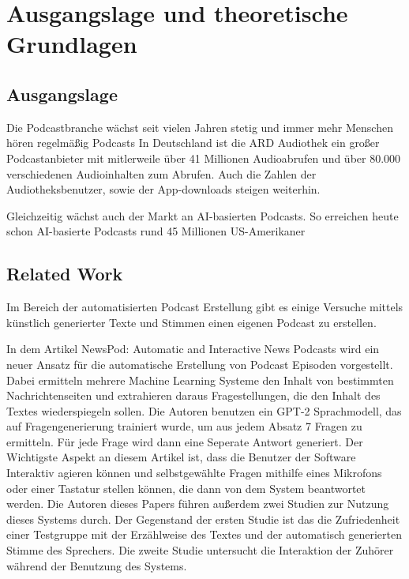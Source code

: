 \chapter{Ausgangslage und theoretische Grundlagen}\label{ch:data}

\section{Ausgangslage}
 
Die Podcastbranche wächst seit vielen Jahren stetig und immer mehr Menschen hören regelmäßig Podcasts 
In Deutschland ist die ARD Audiothek ein großer Podcastanbieter mit mitlerweile über 41 Millionen Audioabrufen und über 80.000 verschiedenen Audioinhalten zum Abrufen. Auch die Zahlen der Audiotheksbenutzer, sowie der App-downloads steigen weiterhin. \cite{gotting2023}

Gleichzeitig wächst auch der Markt an AI-basierten Podcasts. So erreichen heute schon AI-basierte Podcasts rund 45 Millionen US-Amerikaner 

\section{Related Work}

Im Bereich der automatisierten Podcast Erstellung gibt es einige Versuche mittels künstlich generierter Texte und Stimmen einen eigenen Podcast zu erstellen.

In dem Artikel \glqq NewsPod: Automatic and Interactive News Podcasts\grqq{} \cite{laban2022} wird ein neuer Ansatz für die automatische Erstellung von Podcast Episoden vorgestellt. 
Dabei ermitteln mehrere Machine Learning Systeme den Inhalt von bestimmten Nachrichtenseiten und extrahieren daraus Fragestellungen, die den Inhalt des Textes wiederspiegeln sollen. Die Autoren benutzen ein GPT-2 Sprachmodell, das auf Fragengenerierung trainiert wurde, um aus jedem Absatz 7 Fragen zu ermitteln. 
Für jede Frage wird dann eine Seperate Antwort generiert. 
Der Wichtigste Aspekt an diesem Artikel ist, dass die Benutzer der Software Interaktiv agieren können und selbstgewählte Fragen mithilfe eines Mikrofons oder einer Tastatur stellen können, die dann von dem System beantwortet werden. 
Die Autoren dieses Papers führen außerdem zwei Studien zur Nutzung dieses Systems durch.
Der Gegenstand der ersten Studie ist das die Zufriedenheit einer Testgruppe mit der Erzählweise des Textes und der automatisch generierten Stimme des Sprechers. 
Die zweite Studie untersucht die Interaktion der Zuhörer während der Benutzung des Systems. 
\cite{laban2022}

